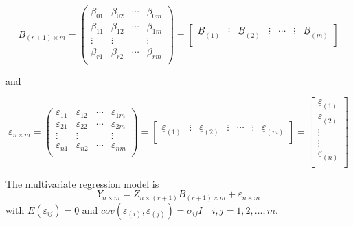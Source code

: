 \documentclass[11pt,a4paper]{article}
\theoremstyle{definition}
\begin{document}
$$B_{(r+1)\times m} = 
\begin{pmatrix}
\beta_{01} & \beta_{02} & \cdots& \beta_{0m}\\
\beta_{11} & \beta_{12} & \cdots& \beta_{1m}\\
\vdots     & \vdots     &                    & \vdots\\
\beta_{r1} & \beta_{r2} & \cdots& \beta_{rm}\\
\end{pmatrix}
=
\begin{bmatrix}
\underline{B}_{(1)} & \vdots & \underline{B}_{(2)} & \vdots & \cdots& \vdots & \underline{B}_{(m)}\\
\end{bmatrix}
$$

and 

$$ \varepsilon_{n\times m} = 
\begin{pmatrix}
\varepsilon_{11} & \varepsilon_{12} & \cdots& \varepsilon_{1m}\\
\varepsilon_{21} & \varepsilon_{22} & \cdots& \varepsilon_{2m}\\
\vdots           &  \vdots                &               &\vdots \\
\varepsilon_{n1} & \varepsilon_{n2} &\cdots& \varepsilon_{nm}\\
\end{pmatrix}
=
\begin{bmatrix}
\underline{\varepsilon}_{(1)} & \vdots & \underline{\varepsilon}_{(2)} & \vdots & \cdots& \vdots & \underline{\varepsilon}_{(m)}\\
\end{bmatrix}
=
\begin{bmatrix}
\underline{\varepsilon}_{(1)}\\
\underline{\varepsilon}_{(2)}\\
\vdots\\
\vdots\\
\underline{\varepsilon}_{(n)}\\
\end{bmatrix}
$$

The multivariate regression model is \begin{equation}\tag{2}
Y_{n\times m} = Z_{n\times (r+1)}B_{(r+1)\times m} + \varepsilon_{n\times m}
\end{equation} 
with $E(\varepsilon_{ij})=\underline{0}$ and $cov(\varepsilon_{(i)},\varepsilon_{(j)})=\sigma_{ij}I\quad  i,j= 1,2,\ldots, m$.\\
\end{document}
